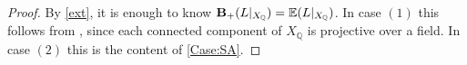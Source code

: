\begin{proof}

	By \autoref{ext}, it is enough to know $\mathbf{B}_{+}(L|_{X_{\mathbb{Q}}})=\mathbb{E}(L|_{X_{\mathbb{Q}}})$. In case $(1)$ this follows from \cite[Theorem 1.3]{birkar2017augmented}, since each connected component of $X_{\mathbb{Q}}$ is projective over a field. In case $(2)$ this is the content of \autoref{Case:SA}.
\end{proof}








